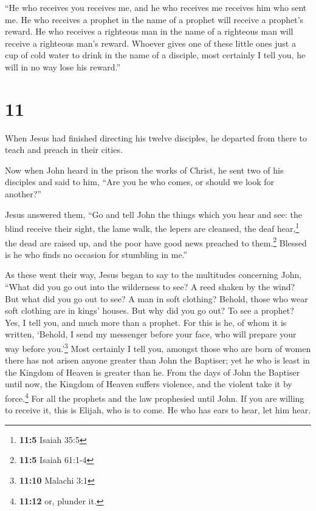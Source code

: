  ``He who receives you receives me, and he who receives
me receives him who sent me.  He who receives a prophet
in the name of a prophet will receive a prophet's reward. He who
receives a righteous man in the name of a righteous man will receive a
righteous man's reward.  Whoever gives one of these
little ones just a cup of cold water to drink in the name of a disciple,
most certainly I tell you, he will in no way lose his reward.''

\hypertarget{section-10}{%
\section{11}\label{section-10}}

 When Jesus had finished directing his twelve disciples,
he departed from there to teach and preach in their cities.

 Now when John heard in the prison the works of Christ, he
sent two of his disciples  and said to him, ``Are you he
who comes, or should we look for another?''

 Jesus answered them, ``Go and tell John the things which
you hear and see:  the blind receive their sight, the lame
walk, the lepers are cleansed, the deaf hear,\footnote{\textbf{11:5}
  Isaiah 35:5} the dead are raised up, and the poor have good news
preached to them.\footnote{\textbf{11:5} Isaiah 61:1-4} 
Blessed is he who finds no occasion for stumbling in me.''

 As these went their way, Jesus began to say to the
multitudes concerning John, ``What did you go out into the wilderness to
see? A reed shaken by the wind?  But what did you go out
to see? A man in soft clothing? Behold, those who wear soft clothing are
in kings' houses.  But why did you go out? To see a
prophet? Yes, I tell you, and much more than a prophet. 
For this is he, of whom it is written, `Behold, I send my messenger
before your face, who will prepare your way before you.'\footnote{\textbf{11:10}
  Malachi 3:1}  Most certainly I tell you, amongst those
who are born of women there has not arisen anyone greater than John the
Baptiser; yet he who is least in the Kingdom of Heaven is greater than
he.  From the days of John the Baptiser until now, the
Kingdom of Heaven suffers violence, and the violent take it by
force.\footnote{\textbf{11:12} or, plunder it.}  For all
the prophets and the law prophesied until John.  If you
are willing to receive it, this is Elijah, who is to come.
 He who has ears to hear, let him hear.

